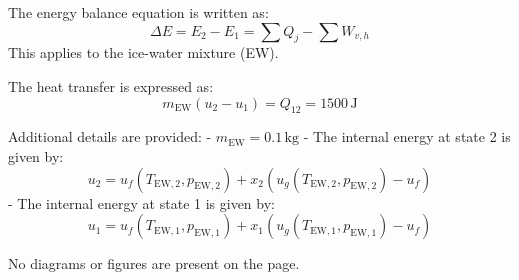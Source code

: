 The energy balance equation is written as:  
\[
\Delta E = E_2 - E_1 = \sum Q_j - \sum W_{v,h}
\]  
This applies to the ice-water mixture (EW).  

The heat transfer is expressed as:  
\[
m_{\text{EW}} (u_2 - u_1) = Q_{12} = 1500 \, \text{J}
\]  

Additional details are provided:  
- \( m_{\text{EW}} = 0.1 \, \text{kg} \)  
- The internal energy at state 2 is given by:  
\[
u_2 = u_f(T_{\text{EW},2}, p_{\text{EW},2}) + x_2 \left( u_g(T_{\text{EW},2}, p_{\text{EW},2}) - u_f \right)
\]  
- The internal energy at state 1 is given by:  
\[
u_1 = u_f(T_{\text{EW},1}, p_{\text{EW},1}) + x_1 \left( u_g(T_{\text{EW},1}, p_{\text{EW},1}) - u_f \right)
\]  

No diagrams or figures are present on the page.